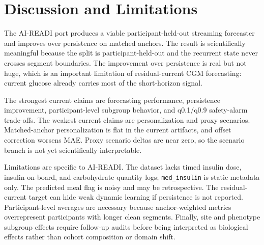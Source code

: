 \section{Discussion and Limitations}
\label{sec:discuss}

The AI-READI port produces a viable participant-held-out streaming forecaster and improves over persistence on matched anchors. The result is scientifically meaningful because the split is participant-held-out and the recurrent state never crosses segment boundaries. The improvement over persistence is real but not huge, which is an important limitation of residual-current CGM forecasting: current glucose already carries most of the short-horizon signal.

The strongest current claims are forecasting performance, persistence improvement, participant-level subgroup behavior, and q0.1/q0.9 safety-alarm trade-offs. The weakest current claims are personalization and proxy scenarios. Matched-anchor personalization is flat in the current artifacts, and offset correction worsens MAE. Proxy scenario deltas are near zero, so the scenario branch is not yet scientifically interpretable.

Limitations are specific to AI-READI. The dataset lacks timed insulin dose, insulin-on-board, and carbohydrate quantity logs; \texttt{med\_insulin} is static metadata only. The predicted meal flag is noisy and may be retrospective. The residual-current target can hide weak dynamic learning if persistence is not reported. Participant-level averages are necessary because anchor-weighted metrics overrepresent participants with longer clean segments. Finally, site and phenotype subgroup effects require follow-up audits before being interpreted as biological effects rather than cohort composition or domain shift.
